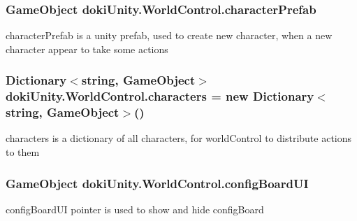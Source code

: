 \subsubsection[{\texorpdfstring{character\+Prefab}{characterPrefab}}]{\setlength{\rightskip}{0pt plus 5cm}Game\+Object doki\+Unity.\+World\+Control.\+character\+Prefab}\hypertarget{classdoki_unity_1_1_world_control_a9bb72d8cad2cc61503e3855ea47d6e6c}{}\label{classdoki_unity_1_1_world_control_a9bb72d8cad2cc61503e3855ea47d6e6c}


character\+Prefab is a unity prefab, used to create new character, when a new character appear to take some actions 

\subsubsection[{\texorpdfstring{characters}{characters}}]{\setlength{\rightskip}{0pt plus 5cm}Dictionary$<$string, Game\+Object$>$ doki\+Unity.\+World\+Control.\+characters = new Dictionary$<$string, Game\+Object$>$()}\hypertarget{classdoki_unity_1_1_world_control_ac9f5d3a5d09d2ebb06d329ca35c7c6c1}{}\label{classdoki_unity_1_1_world_control_ac9f5d3a5d09d2ebb06d329ca35c7c6c1}


characters is a dictionary of all characters, for world\+Control to distribute actions to them 

\subsubsection[{\texorpdfstring{config\+Board\+UI}{configBoardUI}}]{\setlength{\rightskip}{0pt plus 5cm}Game\+Object doki\+Unity.\+World\+Control.\+config\+Board\+UI}\hypertarget{classdoki_unity_1_1_world_control_aa5a18b41fc9213ac80284f21ab447c53}{}\label{classdoki_unity_1_1_world_control_aa5a18b41fc9213ac80284f21ab447c53}


config\+Board\+UI pointer is used to show and hide config\+Board 

